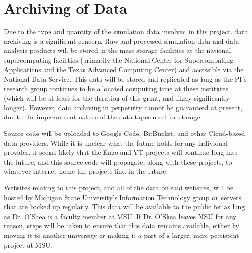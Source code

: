 \documentclass[11pt]{article}
\begin{document}
\vspace{-3mm}
\section{Archiving of Data}
\vspace{-3mm}

Due to the type and quantity of the simulation data involved in this
project, data archiving is a significant concern.  Raw and processed
simulation data and data analysis products will be stored in the mass
storage facilities at the national supercomputing facilities
(primarily the National Center for Supercomputing Applications and the
Texas Advanced Computing Center) and accessible via the National Data
Service.  This data will be stored and replicated as long as the PI's
research group continues to be allocated computing time at these
institutes (which will be at least for the duration of this grant, and
likely significantly longer).  However, data archiving in perpetuity
cannot be guaranteed at present, due to the impermanent nature of the
data tapes used for storage.

Source code will be uploaded to Google Code, BitBucket, and other
Cloud-based data providers.  While it is unclear what the future holds
for any individual provider, it seems likely that the Enzo and YT
projects will continue long into the future, and this source code will
propagate, along with these projects, to whatever Internet home the
projects find in the future.

Websites relating to this project, and all of the data on said
websites, will be hosted by Michigan State University’s Information
Technology group on servers that are backed up regularly.  This data
will be available to the public for as long as Dr. O’Shea is a faculty
member at MSU.  If Dr. O’Shea leaves MSU for any reason, steps will be
taken to ensure that this data remains available, either by moving it
to another university or making it a part of a larger, more persistent
project at MSU.  
\end{document}
